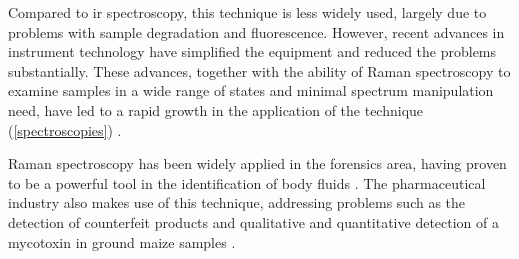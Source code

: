 Compared to \gls{ir} spectroscopy, this technique is less widely used, largely due to problems with sample degradation and fluorescence. However, recent advances in instrument technology have simplified the equipment and reduced the problems substantially. These advances, together with the ability of Raman spectroscopy to examine samples in a wide range of states and minimal spectrum manipulation need, have led to a rapid growth in the application of the technique (\autoref{spectroscopies}) \citep{smith2005modern}.

Raman spectroscopy has been widely applied in the forensics area, having proven to be a powerful tool in the identification of body fluids \citep{virkler2010raman, sikirzhytski2010discriminant, sikirzhytski2012advanced}. The pharmaceutical industry also makes use of this technique, addressing problems such as the detection of counterfeit products \citep{roggo2010identification, sacre2011detection} and qualitative and quantitative detection of a mycotoxin in ground maize samples \citep{lee2013application}.




\setcounter{table}{0} %
\newcommand{\htab}[1]{\textbf{{\footnotesize \textcolor{white}{#1}}}}

